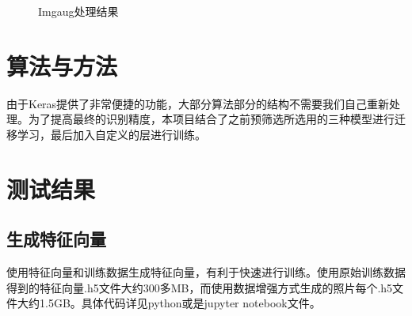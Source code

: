 \documentclass[a4paper,11pt]{article}
\begin{document}
\begin{figure}[htb]
{\label{fig:cat4}
}
\caption{Imgaug处理结果}
\label{fig:cats}
\end{figure}

\section{算法与方法}
\label{sec:org22eece6}
由于Keras提供了非常便捷的功能，大部分算法部分的结构不需要我们自己重新处理。为了提高最终的识别精度，本项目结合了之前预筛选所选用的三种模型进行迁移学习，最后加入自定义的层进行训练。
\section{测试结果}
\label{sec:org5109912}
\subsection{生成特征向量}
\label{sec:orgd4af9e4}
使用特征向量和训练数据生成特征向量，有利于快速进行训练。使用原始训练数据得到的特征向量.h5文件大约300多MB，而使用数据增强方式生成的照片每个.h5文件大约1.5GB。具体代码详见python或是jupyter notebook文件。
\end{document}
